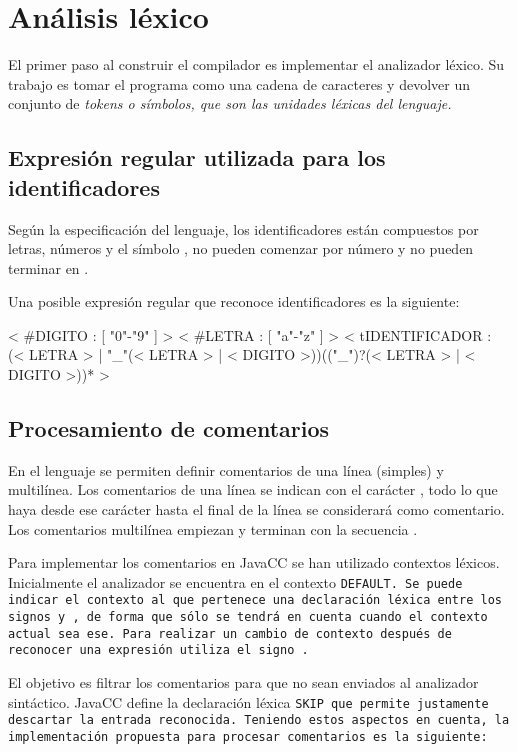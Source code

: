 \section{Análisis léxico}
El primer paso al construir el compilador es implementar el analizador léxico. Su trabajo es tomar el programa como una cadena de caracteres y devolver un conjunto de \it{tokens} o símbolos, que son las unidades léxicas del lenguaje.

\subsection{Expresión regular utilizada para los identificadores}
Según la especificación del lenguaje, los identificadores están compuestos por letras, números y el símbolo \car{\_}, no pueden comenzar por número y no pueden terminar en \car{\_}.

Una posible expresión regular que reconoce identificadores es la siguiente:

\begin{codigo}
< #DIGITO : [ "0"-"9" ] >
< #LETRA : [ "a"-"z" ] >
< tIDENTIFICADOR :
  (< LETRA > | "_"(< LETRA > | < DIGITO >))(("_")?(< LETRA > | < DIGITO >))* >
\end{codigo}

\subsection{Procesamiento de comentarios}
En el lenguaje se permiten definir comentarios de una línea (simples) y multilínea.  Los comentarios de una línea se indican con el carácter \car{\%}, todo lo que haya desde ese carácter hasta el final de la línea se considerará como comentario. Los comentarios multilínea empiezan y terminan con la secuencia \car{\%\%}.

Para implementar los comentarios en JavaCC se han utilizado contextos léxicos.
Inicialmente el analizador se encuentra en el contexto \tt{DEFAULT}.
Se puede indicar el contexto al que pertenece una declaración léxica entre los signos \car{\textless} y \car{\textgreater}, de forma que sólo se tendrá en cuenta cuando el contexto actual sea ese. Para realizar un cambio de contexto después de reconocer una expresión utiliza el signo \car{:}.

El objetivo es filtrar los comentarios para que no sean enviados al analizador sintáctico. JavaCC define la declaración léxica \tt{SKIP} que permite justamente descartar la entrada reconocida. Teniendo estos aspectos en cuenta, la implementación propuesta para procesar comentarios es la siguiente:

